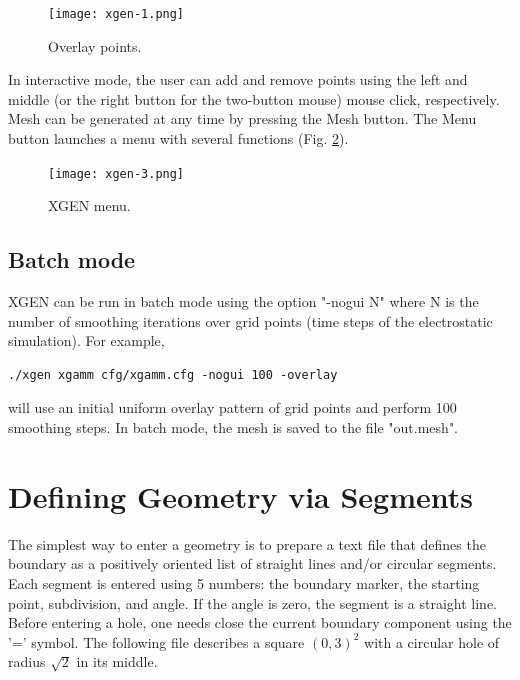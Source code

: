 \documentclass[12pt]{article}
\begin{document}
\newpage

  \begin{figure}[!ht]
  \begin{center}
  \texttt{[image: xgen-1.png]}
  \end{center}
  \vspace{-6mm}
  \caption{Overlay points.}
  \label{fig:overlay}
  \end{figure}
\noindent 
  In interactive mode, the user can add and remove points using the left and middle  
  (or the right button for the two-button mouse) mouse click,
  respectively. Mesh can be generated at any time by pressing the Mesh button.
  The Menu button launches a menu with several functions
  (Fig. \ref{fig:menu}). 

  \begin{figure}[!ht]
  \begin{center}
  \texttt{[image: xgen-3.png]}
  \end{center}
  \vspace{-6mm}
  \caption{XGEN menu.}
  \label{fig:menu}
  \end{figure}

\subsection{Batch mode}

XGEN can be run in batch mode using the option "-nogui N" where N is the number 
of smoothing iterations over grid points (time steps of the electrostatic 
simulation). For example, 

\begin{verbatim}
./xgen xgamm cfg/xgamm.cfg -nogui 100 -overlay
\end{verbatim}

\noindent
will use an initial uniform overlay pattern of grid points and 
perform 100 smoothing steps. In batch mode, the mesh is saved to 
the file "out.mesh".

  \section{Defining Geometry via Segments}

  The simplest way to enter a geometry is to prepare a text file 
  that defines the boundary as a positively oriented list of 
  straight lines and/or circular segments. Each segment is 
  entered using 5 numbers: the boundary marker, the starting 
  point, subdivision, and angle. If the angle is zero, the segment
  is a straight line. Before entering a hole, one needs close the
  current boundary component using the '=' symbol. The following 
  file describes a square $(0, 3)^2$ with a circular hole of
  radius $\sqrt{2}$ in its middle. 
\end{document}
